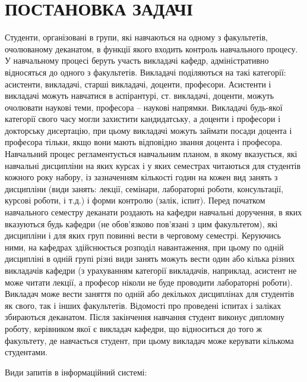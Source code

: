 \newpage
\chapter{ПОСТАНОВКА ЗАДАЧІ}
Студенти, організовані в групи, які навчаються на одному з 
факультетів, очолюваному деканатом, в функції якого входить 
контроль навчального процесу. У навчальному процесі беруть 
участь викладачі кафедр, адміністративно відносяться до одного 
з факультетів. Викладачі поділяються на такі категорії: асистенти, 
викладачі, старші викладачі, доценти, професори. Асистенти і 
викладачі можуть навчатися в аспірантурі, ст. викладачі, доценти, 
можуть очолювати наукові теми, професора -- наукові напрямки. 
Викладачі будь-якої категорії свого часу могли захистити 
кандидатську, а доценти і професори і докторську дисертацію, 
при цьому викладачі можуть займати посади доцента і професора 
тільки, якщо вони мають відповідно звання доцента і професора.
Навчальний процес регламентується навчальним планом, в якому 
вказується, які навчальні дисципліни на яких курсах і у яких 
семестрах читаються для студентів кожного року набору, із 
зазначенням кількості годин на кожен вид занять з дисципліни 
(види занять: лекції, семінари, лабораторні роботи, консультації, 
курсові роботи, і т.д.) і форми контролю (залік, іспит). 
Перед початком навчального семестру деканати роздають на кафедри 
навчальні доручення, в яких вказуються будь кафедри (не обов'язково
пов'язані з цим факультетом), які дисципліни і для яких груп
повинні вести в черговому семестрі. Керуючись ними, на кафедрах 
здійснюється розподіл навантаження, при цьому по одній дисципліні 
в одній групі різні види занять можуть вести один або кілька різних
викладачів кафедри (з урахуванням категорії викладачів, наприклад, 
асистент не може читати лекції, а професор ніколи не буде проводити
лабораторні роботи). Викладач може вести заняття по одній або декількох
дисциплінах для студентів як свого, так і інших факультетів. Відомості
про проведені іспитах і заліках збираються деканатом.
Після закінчення навчання студент виконує дипломну роботу, 
керівником якої є викладач кафедри, що відноситься до того 
ж факультету, де навчається студент, при цьому викладач може 
керувати кількома студентами. 

\label{task_list}Види запитів в інформаційний системі:

